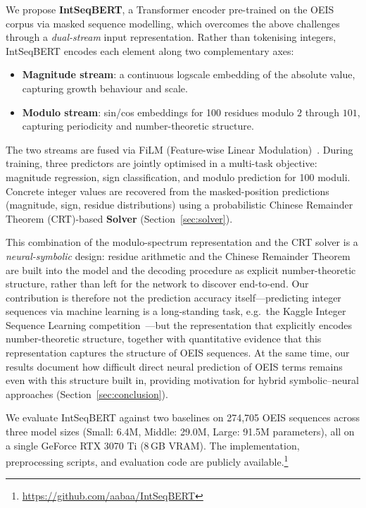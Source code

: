 We propose \textbf{IntSeqBERT}, a Transformer encoder pre-trained on the OEIS corpus via masked
sequence modelling, which overcomes the above challenges through a \emph{dual-stream} input
representation. Rather than tokenising integers, IntSeqBERT encodes each element along two
complementary axes:
\begin{itemize}
  \item \textbf{Magnitude stream}: a continuous log\-scale embedding of the
        absolute value, capturing growth behaviour and scale.
  \item \textbf{Modulo stream}: sin/cos embeddings for 100 residues modulo $2$ through $101$,
        capturing periodicity and number-theoretic structure.
\end{itemize}
The two streams are fused via FiLM (Feature-wise Linear Modulation)~\cite{perez2018film}.
During training, three predictors are jointly optimised in a multi-task objective: magnitude
regression, sign classification, and modulo prediction for 100 moduli. Concrete integer values
are recovered from the masked-position predictions (magnitude, sign, residue distributions)
using a probabilistic Chinese Remainder Theorem (CRT)-based \textbf{Solver} (Section~\ref{sec:solver}).

This combination of the modulo-spectrum representation and the CRT solver is a
\emph{neural-symbolic} design: residue arithmetic and the Chinese Remainder Theorem are
built into the model and the decoding procedure as explicit number-theoretic structure,
rather than left for the network to discover end-to-end. Our contribution is therefore not
the prediction accuracy itself---predicting integer sequences via machine learning is a
long-standing task, e.g.\ the Kaggle Integer Sequence Learning
competition~\cite{kaggle-integer-seq}---but the representation that explicitly encodes
number-theoretic structure, together with quantitative evidence that this representation
captures the structure of OEIS sequences. At the same time, our results document how
difficult direct neural prediction of OEIS terms remains even with this structure built in,
providing motivation for hybrid symbolic--neural approaches (Section~\ref{sec:conclusion}).

We evaluate IntSeqBERT against two baselines on 274,705 OEIS sequences across three model
sizes (Small: 6.4M, Middle: 29.0M, Large: 91.5M parameters), all on a
single GeForce RTX 3070 Ti (8\,GB VRAM).
The implementation, preprocessing scripts, and evaluation code are publicly
available.\footnote{\url{https://github.com/aabaa/IntSeqBERT}}

